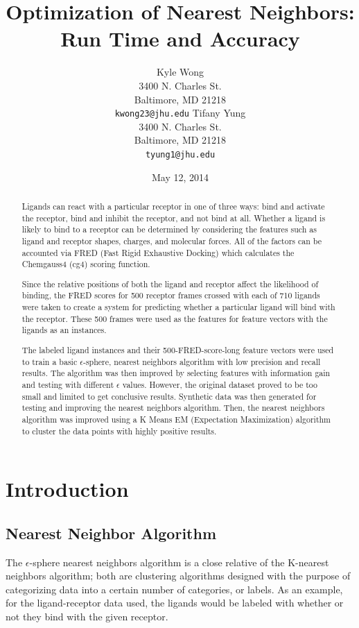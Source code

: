 \documentclass[11pt,letterpaper]{article}
\title{Optimization of Nearest Neighbors: Run Time and Accuracy}
\author{Kyle Wong \\
  3400 N. Charles St. \\
  Baltimore, MD 21218 \\
  {\tt kwong23@jhu.edu}
  \And
  Tifany Yung \\
  3400 N. Charles St. \\
  Baltimore, MD 21218 \\
  {\tt tyung1@jhu.edu}}
\date{May 12, 2014}
\begin{document}
\maketitle
\begin{abstract}
Ligands can react with a particular receptor in one of three ways: bind and activate the receptor, bind and inhibit the receptor, and not bind at all. Whether a ligand is likely to bind to a receptor can be determined by considering the features such as ligand and receptor shapes, charges, and molecular forces. All of the factors can be accounted via FRED (Fast Rigid Exhaustive Docking) which calculates the Chemgauss4 (cg4) scoring function.

Since the relative positions of both the ligand and receptor affect the likelihood of binding, the FRED scores for 500 receptor frames crossed with each of 710 ligands were taken to create a system for predicting whether a particular ligand will bind with the receptor. These 500 frames were used as the features for feature vectors with the ligands as an instances.

The labeled ligand instances and their 500-FRED-score-long feature vectors were used to train a basic $\epsilon$-sphere, nearest neighbors algorithm with low precision and recall results. The algorithm was then improved by selecting features with information gain and testing with different $\epsilon$ values.  However, the original dataset proved to be too small and limited to get conclusive results.  Synthetic data was then generated for testing and improving the nearest neighbors algorithm.  Then, the nearest neighbors algorithm was improved using a K Means EM (Expectation Maximization) algorithm to cluster the data points with highly positive results.  
\end{abstract}

\section{Introduction}
\subsection{Nearest Neighbor Algorithm}

The $\epsilon$-sphere nearest neighbors algorithm is a close relative of the K-nearest neighbors algorithm; both are clustering algorithms designed with the purpose of categorizing data into a certain number of categories, or labels. As an example, for the ligand-receptor data used, the ligands would be labeled with whether or not they bind with the given receptor.
\end{document}
